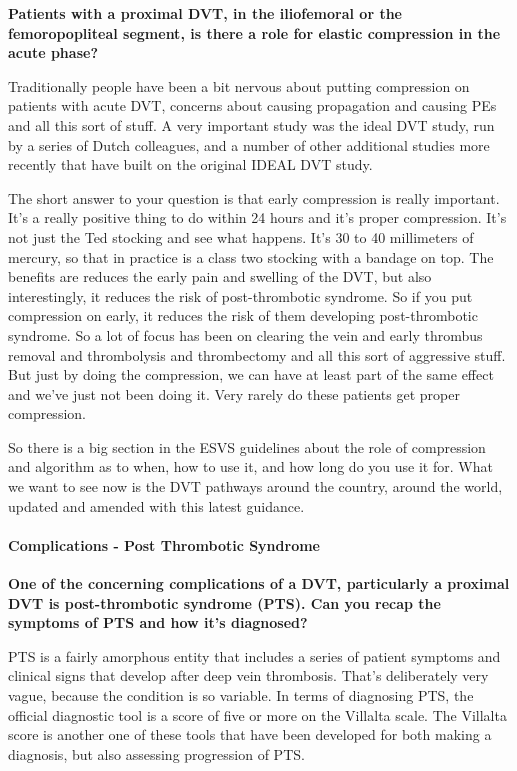 \documentclass[
]{book}
\begin{document}
\textbf{Patients with a proximal DVT, in the iliofemoral or the
femoropopliteal segment, is there a role for elastic compression in the
acute phase?}

Traditionally people have been a bit nervous about putting compression
on patients with acute DVT, concerns about causing propagation and
causing PEs and all this sort of stuff. A very important study was the
ideal DVT study\citep{tencate-hoek2018}, run by a series of Dutch colleagues,
and a number of other additional studies more recently that have built
on the original IDEAL DVT study.\citep{schreurs2022}

The short answer to your question is that early compression is really
important. It's a really positive thing to do within 24 hours and it's
proper compression. It's not just the Ted stocking and see what happens.
It's 30 to 40 millimeters of mercury, so that in practice is a class two
stocking with a bandage on top. The benefits are reduces the early pain
and swelling of the DVT, but also interestingly, it reduces the risk of
post-thrombotic syndrome. So if you put compression on early, it reduces
the risk of them developing post-thrombotic syndrome. So a lot of focus
has been on clearing the vein and early thrombus removal and
thrombolysis and thrombectomy and all this sort of aggressive stuff. But
just by doing the compression, we can have at least part of the same
effect and we've just not been doing it. Very rarely do these patients
get proper compression.

So there is a big section in the ESVS guidelines about the role of
compression and algorithm as to when, how to use it, and how long do you
use it for. What we want to see now is the DVT pathways around the
country, around the world, updated and amended with this latest
guidance.\citep{kakkos2021}

\hypertarget{complications---post-thrombotic-syndrome}{%
\paragraph{Complications - Post Thrombotic Syndrome}\label{complications---post-thrombotic-syndrome}}

\textbf{One of the concerning complications of a DVT, particularly a proximal
DVT is post-thrombotic syndrome (PTS). Can you recap the symptoms of PTS
and how it's diagnosed?}

PTS is a fairly amorphous entity that includes a series of patient
symptoms and clinical signs that develop after deep vein thrombosis.
That's deliberately very vague, because the condition is so variable. In
terms of diagnosing PTS, the official diagnostic tool is a score of five
or more on the Villalta scale. The Villalta score is another one of
these tools that have been developed for both making a diagnosis, but
also assessing progression of PTS.\citep{kahn2014, villalta1994}
\end{document}
